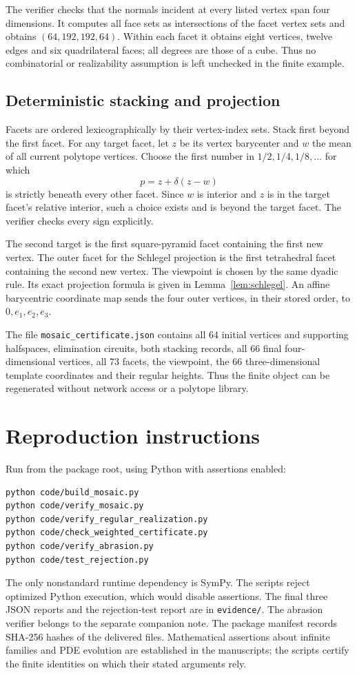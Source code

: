 \documentclass[11pt,a4paper]{article}
\theoremstyle{definition}\newtheorem{definition}[theorem]{Definition}
\theoremstyle{remark}\newtheorem{remark}[theorem]{Remark}
\begin{document}
The verifier checks that the normals incident at every listed vertex span four dimensions. It computes all face sets as intersections of the facet vertex sets and obtains \((64,192,192,64)\). Within each facet it obtains eight vertices, twelve edges and six quadrilateral faces; all degrees are those of a cube. Thus no combinatorial or realizability assumption is left unchecked in the finite example.

\subsection{Deterministic stacking and projection}
Facets are ordered lexicographically by their vertex-index sets. Stack first beyond the first facet. For any target facet, let \(z\) be its vertex barycenter and \(w\) the mean of all current polytope vertices. Choose the first number in \(1/2,1/4,1/8,\ldots\) for which
\[
 p=z+\delta(z-w)
\]
is strictly beneath every other facet. Since \(w\) is interior and \(z\) is in the target facet's relative interior, such a choice exists and is beyond the target facet. The verifier checks every sign explicitly.

The second target is the first square-pyramid facet containing the first new vertex. The outer facet for the Schlegel projection is the first tetrahedral facet containing the second new vertex. The viewpoint is chosen by the same dyadic rule. Its exact projection formula is given in Lemma~\ref{lem:schlegel}. An affine barycentric coordinate map sends the four outer vertices, in their stored order, to \(0,e_1,e_2,e_3\).

The file \texttt{mosaic\_certificate.json} contains all 64 initial vertices and supporting halfspaces, elimination circuits, both stacking records, all 66 final four-dimensional vertices, all 73 facets, the viewpoint, the 66 three-dimensional template coordinates and their regular heights. Thus the finite object can be regenerated without network access or a polytope library.

\section{Reproduction instructions}
Run from the package root, using Python with assertions enabled:
\begin{verbatim}
python code/build_mosaic.py
python code/verify_mosaic.py
python code/verify_regular_realization.py
python code/check_weighted_certificate.py
python code/verify_abrasion.py
python code/test_rejection.py
\end{verbatim}
The only nonstandard runtime dependency is SymPy. The scripts reject optimized Python execution, which would disable assertions. The final three JSON reports and the rejection-test report are in \texttt{evidence/}. The abrasion verifier belongs to the separate companion note. The package manifest records SHA-256 hashes of the delivered files. Mathematical assertions about infinite families and PDE evolution are established in the manuscripts; the scripts certify the finite identities on which their stated arguments rely.
\end{document}

